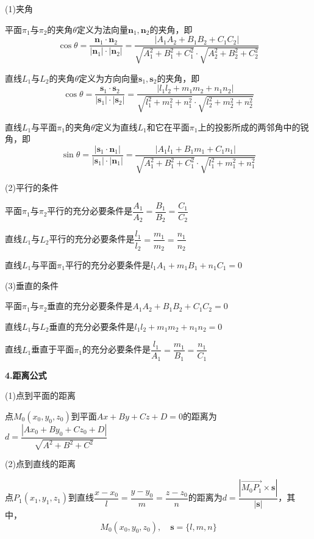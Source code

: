 (1)夹角

平面$\pi_1$与$\pi_2$的夹角$\theta$定义为法向量$\bm{n}_1,\bm{n}_2$的夹角，即
\begin{equation}
    \cos\theta=\dfrac{\bm{n}_1\cdot\bm{n}_2}{|\bm{n}_1|\cdot|\bm{n}_2|}=\dfrac{|A_1A_2+B_1B_2+C_1C_2|}{\sqrt{A_1^2+B_1^2+C_1^2}\cdot\sqrt{A_2^2+B_2^2+C_2^2}}
    \nonumber
\end{equation}

直线$L_1$与$L_2$的夹角$\theta$定义为方向向量$\bm{s}_1,\bm{s}_2$的夹角，即
\begin{equation}
    \cos\theta=\dfrac{\bm{s}_1\cdot\bm{s}_2}{|\bm{s}_1|\cdot|\bm{s}_2|}=\dfrac{|l_1l_2+m_1m_2+n_1n_2|}{\sqrt{l_1^2+m_1^2+n_1^2}\cdot\sqrt{l_2^2+m_2^2+n_2^2}}
    \nonumber
\end{equation}

直线$L_1$与平面$\pi_1$的夹角$\theta$定义为直线$L_1$和它在平面$\pi_1$上的投影所成的两邻角中的锐角，即
\begin{equation}
    \sin\theta=\dfrac{|\bm{s}_1\cdot\bm{n}_1|}{|\bm{s}_1|\cdot|\bm{n}_1|}=\dfrac{|A_1l_1+B_1m_1+C_1n_1|}{\sqrt{A_1^2+B_1^2+C_1^2}\cdot\sqrt{l_1^2+m_1^2+n_1^2}}
    \nonumber
\end{equation}

(2)平行的条件

平面$\pi_1$与$\pi_2$平行的充分必要条件是$\dfrac{A_1}{A_2}=\dfrac{B_1}{B_2}=\dfrac{C_1}{C_2}$

直线$L_1$与$L_2$平行的充分必要条件是$\dfrac{l_1}{l_2}=\dfrac{m_1}{m_2}=\dfrac{n_1}{n_2}$

直线$L_1$与平面$\pi_1$平行的充分必要条件是$l_1A_1+m_1B_1+n_1C_1=0$

(3)垂直的条件

平面$\pi_1$与$\pi_2$垂直的充分必要条件是$A_1A_2+B_1B_2+C_1C_2=0$

直线$L_1$与$L_2$垂直的充分必要条件是$l_1l_2+m_1m_2+n_1n_2=0$

直线$L_1$垂直于平面$\pi_1$的充分必要条件是$\dfrac{l_1}{A_1}=\dfrac{m_1}{B_1}=\dfrac{n_1}{C_1}$

\textbf{4.距离公式}

(1)点到平面的距离

点$M_0(x_0,y_0,z_0)$到平面$Ax+By+Cz+D=0$的距离为$d=\dfrac{|Ax_0+By_0+Cz_0+D|}{\sqrt{A^2+B^2+C^2}}$

(2)点到直线的距离

点$P_1(x_1,y_1,z_1)$到直线$\dfrac{x-x_0}{l}=\dfrac{y-y_0}{m}=\dfrac{z-z_0}{n}$的距离为$d=\dfrac{|\overrightarrow{M_0P_1}\times\bm{s}|}{|\bm{s}|}$，其中，
\begin{equation}
    M_0(x_0,y_0,z_0), \quad \bm{s}=\{l,m,n\}
    \nonumber
\end{equation}

